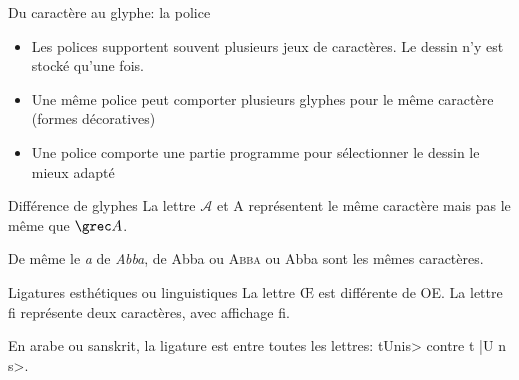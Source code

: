\begin{frame}{Du caractère au glyphe: la police}
  \begin{itemize}
  \item Les polices supportent souvent plusieurs jeux de caractères. Le
    dessin n'y est stocké qu'une fois.
  \item[\dialogerror] Une même police peut comporter plusieurs glyphes pour le même caractère (formes décoratives)
  \item Une police comporte une partie programme pour sélectionner le dessin le mieux adapté
  \end{itemize}
  \begin{block}{Différence de glyphes}
    La lettre {\Large{$\mathcal{A}$}} et {\Large{A}} représentent le
    même caractère mais pas le même que $\Alpha$.

    De même le \emph{a} de \emph{Abba}, de {\selectfont
      Abba} ou \textsc{Abba} ou \textrm{Abba} sont les mêmes caractères.
  \end{block}

  \begin{block}{Ligatures esthétiques ou linguistiques}
    La lettre {\Large\OE{}} est différente de
    {\Large{OE}}. La lettre {\textrm{\Large f{}i}} représente
    deux caractères, avec affichage \textrm{\Large{fi}}.

    En arabe ou sanskrit, la ligature est entre toutes les lettres:
    \novocalize
    \<tUnis> contre \<t |U n s>.
  \end{block}
\end{frame}
